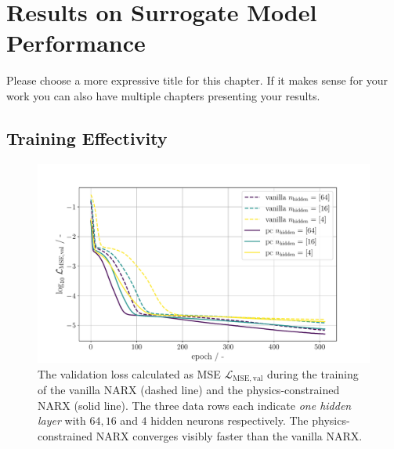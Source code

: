 \chapter{Results on Surrogate Model Performance}
Please choose a more expressive title for this chapter. If it makes sense for your work you can also have multiple chapters presenting your results.

\section{Training Effectivity}

\begin{figure}
    \centering
    \includegraphics[width=1\textwidth]{Figures/Results/001_val_loss.pdf}
    \caption[Validation loss of vanilla NARX vs physics-constrained NARX]{The validation loss calculated as MSE $\mathcal{L}_\mathrm{MSE, val}$
    during the training of the vanilla NARX (dashed line) and the physics-constrained NARX (solid line). The three data rows each indicate
    \emph{one hidden layer} with $64, 16$ and $4$ hidden neurons respectively. The physics-constrained NARX converges visibly faster
    than the vanilla NARX.}
    \label{intro:fig:01_data}
\end{figure}
